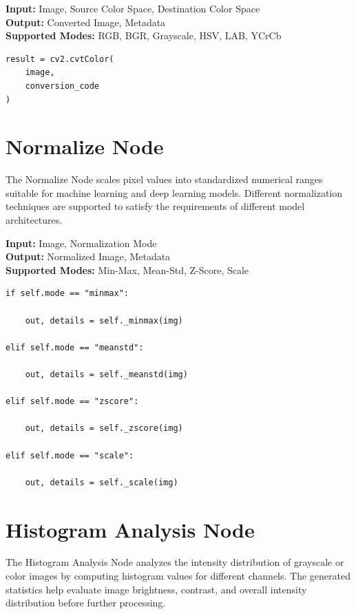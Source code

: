 \documentclass[a4paper,12pt]{report}
\begin{document}
\noindent \textbf{Input:} Image, Source Color Space, Destination Color Space \\
\textbf{Output:} Converted Image, Metadata \\
\textbf{Supported Modes:} RGB, BGR, Grayscale, HSV, LAB, YCrCb

\begin{lstlisting}[caption={Core Algorithm}, label={lst:color-space-conversion-node}]
result = cv2.cvtColor(
    image,
    conversion_code
)
\end{lstlisting}

\section{Normalize Node}
\label{sec:normalize-node}

The Normalize Node scales pixel values into standardized numerical ranges
suitable for machine learning and deep learning models. Different
normalization techniques are supported to satisfy the requirements of
different model architectures.

\noindent \textbf{Input:} Image, Normalization Mode \\
\textbf{Output:} Normalized Image, Metadata \\
\textbf{Supported Modes:} Min-Max, Mean-Std, Z-Score, Scale

\begin{lstlisting}[caption={Core Algorithm}, label={lst:normalize-node}]
if self.mode == "minmax":

    out, details = self._minmax(img)

elif self.mode == "meanstd":

    out, details = self._meanstd(img)

elif self.mode == "zscore":

    out, details = self._zscore(img)

elif self.mode == "scale":

    out, details = self._scale(img)
\end{lstlisting}

\section{Histogram Analysis Node}
\label{sec:histogram-analysis-node}

The Histogram Analysis Node analyzes the intensity distribution of
grayscale or color images by computing histogram values for different
channels. The generated statistics help evaluate image brightness,
contrast, and overall intensity distribution before further processing.
\end{document}
